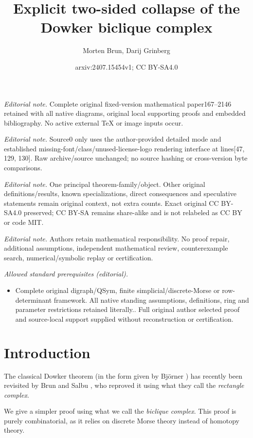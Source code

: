 \documentclass[numbers=enddot,12pt,final,onecolumn,notitlepage]{scrartcl}%
\title{Explicit two-sided collapse of the Dowker biclique complex}
\author{Morten Brun, Darij Grinberg}
\date{arxiv:2407.15454v1; CC BY-SA4.0}
\theoremstyle{definition}
\begin{document}
\maketitle
\noindent\textit{Editorial note.} Complete original fixed-version mathematical paper167--2146 retained with all native diagrams, original local supporting proofs and embedded bibliography. No active external TeX or image inputs occur.\par\medskip
\noindent\textit{Editorial note.} Source0 only uses the author-provided detailed mode and established missing-font/class/unused-license-logo rendering interface at lines[47, 129, 130]. Raw archive/source unchanged; no source hashing or cross-version byte comparisons.\par\medskip
\noindent\textit{Editorial note.} One principal theorem-family/object. Other original definitions/results, known specializations, direct consequences and speculative statements remain original context, not extra counts. Exact original CC BY-SA4.0 preserved; CC BY-SA remains share-alike and is not relabeled as CC BY or code MIT.\par\medskip
\noindent\textit{Editorial note.} Authors retain mathematical responsibility. No proof repair, additional assumptions, independent mathematical review, counterexample search, numerical/symbolic replay or certification.\par\medskip
\noindent\textit{Allowed standard prerequisites (editorial).}\begin{itemize}
\item Complete original digraph/QSym, finite simplicial/discrete-Morse or row-determinant framework. All native standing assumptions, definitions, ring and parameter restrictions retained literally.. Full original author selected proof and source-local support supplied without reconstruction or certification.
\end{itemize}\medskip
\section{Introduction}

The classical Dowker theorem (in the form given by Bj\"{o}rner
\cite[Theorem 10.9]{Bjorne95}) has recently been revisited by Brun and Salbu
\cite{BruSal22}, who reproved it using what they call the \textit{rectangle
complex}.

We give a simpler proof using what we call the \textit{biclique complex}. This
proof is purely combinatorial, as it relies on discrete Morse theory instead
of homotopy theory.
\end{document}
